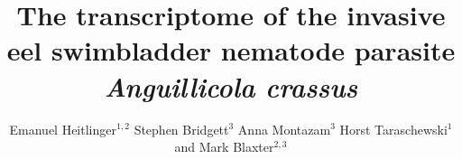 \documentclass[10pt]{bmc_article}
\newenvironment{bmcformat}{\begin{raggedright}\baselineskip20pt\sloppy\setboolean{publ}{false}}{\end{raggedright}\baselineskip20pt\sloppy}
\begin{document}
\begin{bmcformat}


  \title{The transcriptome of the invasive eel swimbladder nematode
    parasite \textit{Anguillicola crassus}}
 


\author{Emanuel Heitlinger\correspondingauthor$^{1,2}$%
       Stephen Bridgett$^{3}$%
       Anna Montazam$^{3}$%
       Horst Taraschewski$^1$%
       and Mark Blaxter$^{2,3}$%
     }%
      


      \address{%
        \iid(1)Department of Ecology and Parasitology, Zoological
        Institute 1, University of Karlsruhe,%
        Kornblumenstrasse 13, Karlsruhe, Germany\\
        \iid(2)Institute of Evolutionary Biology, The Ashworth laboratories, The University of Edinburgh, King's Buildings Campus, Edinburgh EH9 3JT, UK
        \iid(3)The GenePool Sequencing Service, The Ashworth laboratories, The University of Edinburgh, King's Buildings Campus, Edinburgh EH9 3JT, UK
      }%

\maketitle


\end{bmcformat}
\end{document}
